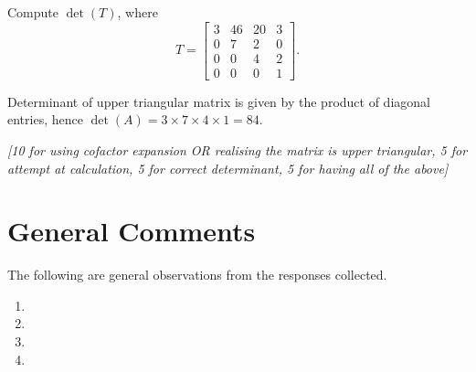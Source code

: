 \documentclass[answers,11pt]{exam}
\theoremstyle{definition}
\DeclareMathOperator{\1}{\mathbbm{1}}
\begin{document}
\begin{questions}
\question[25] Compute $\det(T)$, where 
\begin{equation*}
T=
\begin{bmatrix}
3&46&20&3\\
0&7&2&0\\
0&0&4&2\\
0&0&0&1
\end{bmatrix}.
\end{equation*}

\begin{solution}
	Determinant of upper triangular matrix is given by the product of diagonal entries, hence $\det(A) = 3 \times 7 \times 4 \times 1 = 84$.
	
	\textit{[10 for using cofactor expansion OR realising the matrix is upper triangular, 5 for attempt at calculation, 5 for correct determinant, 5 for having all of the above]}
\end{solution}


\end{questions}

\clearpage


\section*{General Comments}

The following are general observations from the responses collected.


\begin{enumerate}
	\item 
	
	
	
	\item 
	
	
	
	
	
	\item 
	
	
	
	
	\item
\end{enumerate}
\end{document}
